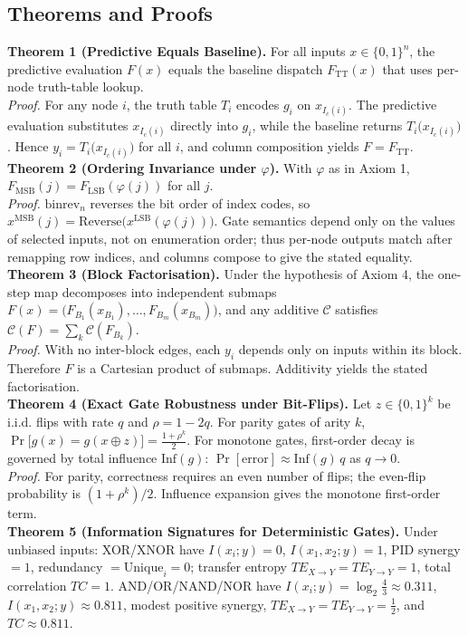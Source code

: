 \documentclass[11pt]{article}
\begin{document}
\subsection{Theorems and Proofs}
\textbf{Theorem 1 (Predictive Equals Baseline).} For all inputs $x\in\{0,1\}^n$, the predictive evaluation $F(x)$ equals the baseline dispatch $F_{\mathrm{TT}}(x)$ that uses per-node truth-table lookup.\\
\emph{Proof.} For any node $i$, the truth table $T_i$ encodes $g_i$ on $x_{I_c(i)}$. The predictive evaluation substitutes $x_{I_c(i)}$ directly into $g_i$, while the baseline returns $T_i\big(x_{I_c(i)}\big)$. Hence $y_i= T_i\big(x_{I_c(i)}\big)$ for all $i$, and column composition yields $F=F_{\mathrm{TT}}$.\\
\textbf{Theorem 2 (Ordering Invariance under $\varphi$).} With $\varphi$ as in Axiom 1, $F_{\mathrm{MSB}}(j)=F_{\mathrm{LSB}}(\varphi(j))$ for all $j$.\\
\emph{Proof.} $\mathrm{binrev}_n$ reverses the bit order of index codes, so $x^{\mathrm{MSB}}(j)=\mathrm{Reverse}\big(x^{\mathrm{LSB}}(\varphi(j))\big)$. Gate semantics depend only on the values of selected inputs, not on enumeration order; thus per-node outputs match after remapping row indices, and columns compose to give the stated equality.\\
\textbf{Theorem 3 (Block Factorisation).} Under the hypothesis of Axiom 4, the one-step map decomposes into independent submaps $F(x)=\big(F_{B_1}(x_{B_1}),\dots,F_{B_m}(x_{B_m})\big)$, and any additive $\mathcal{C}$ satisfies $\mathcal{C}(F)=\sum_k \mathcal{C}(F_{B_k})$.\\
\emph{Proof.} With no inter-block edges, each $y_i$ depends only on inputs within its block. Therefore $F$ is a Cartesian product of submaps. Additivity yields the stated factorisation.\\
\textbf{Theorem 4 (Exact Gate Robustness under Bit-Flips).} Let $z\in\{0,1\}^k$ be i.i.d. flips with rate $q$ and $\rho=1-2q$. For parity gates of arity $k$, $\Pr\big[g(x)=g(x\oplus z)\big]=\tfrac{1+\rho^k}{2}$. For monotone gates, first-order decay is governed by total influence $\mathrm{Inf}(g)$: $\Pr[\text{error}]\approx \mathrm{Inf}(g)\,q$ as $q\to 0$.\\
\emph{Proof.} For parity, correctness requires an even number of flips; the even-flip probability is $(1+\rho^k)/2$. Influence expansion gives the monotone first-order term.\\
\textbf{Theorem 5 (Information Signatures for Deterministic Gates).} Under unbiased inputs: XOR/XNOR have $I(x_i;y)=0$, $I(x_1,x_2;y)=1$, PID synergy $=1$, redundancy $=\mathrm{Unique}_i=0$; transfer entropy $TE_{X\to Y}=TE_{Y\to Y}=1$, total correlation $TC=1$. AND/OR/NAND/NOR have $I(x_i;y)=\log_2\tfrac{4}{3}\approx 0.311$, $I(x_1,x_2;y)\approx 0.811$, modest positive synergy, $TE_{X\to Y}=TE_{Y\to Y}=\tfrac{1}{2}$, and $TC\approx 0.811$.\\
\end{document}

